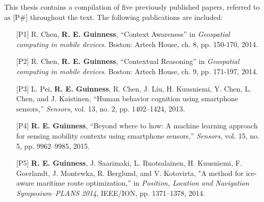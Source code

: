 This thesis contains a compilation of five previously published papers, referred to as [P\#] throughout the text. The following publications are included:

\begin{itemize}[leftmargin=2cm,labelsep=0.5cm]

\item [{[P1]}] R. Chen, \textbf{R. E. Guinness}, ``Context Awareness'' in \emph{Geospatial computing in mobile devices}. Boston: Artech House, ch. 8, pp. 150-170, 2014.
\item [{[P2]}] R. Chen, \textbf{R. E. Guinness}, ``Contextual Reasoning'' in \emph{Geospatial computing in mobile devices}. Boston: Artech House, ch. 9, pp. 171-197, 2014.
\item [{[P3]}] L. Pei, \textbf{R. E. Guinness}, R. Chen, J. Liu, H. Kuusniemi, Y. Chen, L. Chen, and J. Kaistinen, ``Human behavior cognition using smartphone sensors,'' \emph{Sensors}, vol. 13, no. 2, pp. 1402--1424, 2013.

\item [{[P4]}] \textbf{R. E. Guinness}, ``Beyond where to how: A machine learning approach for sensing mobility contexts using smartphone sensors,'' \emph{Sensors}, vol. 15, no. 5, pp. 9962--9985, 2015.

\item [{[P5]}] \textbf{R. E. Guinness}, J. Saarimaki, L. Ruotsalainen, H. Kuusniemi, F. Goerlandt, J. Montewka, R. Berglund, and V. Kotovirta, "A method for ice-aware maritime route optimization,'' in \emph{Position, Location and Navigation Symposium--PLANS 2014}, IEEE/ION, pp. 1371--1378, 2014.

\end{itemize}
